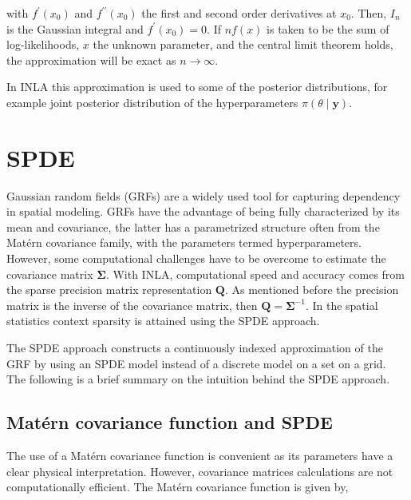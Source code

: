 \documentclass[
]{book}
\begin{document}
with \(f^{\prime}(x_0)\) and \(f^{\prime\prime}(x_0)\) the first and second order derivatives at \(x_0\). Then, \(I_n\) is the Gaussian integral and \(f^{\prime}(x_0) = 0\). If \(nf(x)\) is taken to be the sum of log-likelihoods, \(x\) the unknown parameter, and the central limit theorem holds, the approximation will be exact as \(n{\rightarrow}\infty\).

In INLA this approximation is used to some of the posterior distributions, for example joint posterior distribution of the hyperparameters \(\pi\left(\theta\mid \mathbf{y}\right)\).

\hypertarget{spde}{%
\section*{SPDE}\label{spde}}

Gaussian random fields (GRFs) are a widely used tool for capturing dependency in spatial modeling. GRFs have the advantage of being fully characterized by its mean and covariance, the latter has a parametrized structure often from the Matérn covariance family, with the parameters termed hyperparameters. However, some computational challenges have to be overcome to estimate the covariance matrix \(\mathbf{\Sigma}\). With INLA, computational speed and accuracy comes from the sparse precision matrix representation \(\mathbf{Q}\). As mentioned before the precision matrix is the inverse of the covariance matrix, then \(\mathbf{Q} = \mathbf{\Sigma}^{-1}\). In the spatial statistics context sparsity is attained using the SPDE approach.

The SPDE approach constructs a continuously indexed approximation of the GRF by using an SPDE model instead of a discrete model on a set on a grid. The following is a brief summary on the intuition behind the SPDE approach.

\hypertarget{matuxe9rn-covariance-function-and-spde}{%
\subsection*{Matérn covariance function and SPDE}\label{matuxe9rn-covariance-function-and-spde}}

The use of a Matérn covariance function is convenient as its parameters have a clear physical interpretation. However, covariance matrices calculations are not computationally efficient. The Matérn covariance function is given by,
\end{document}
